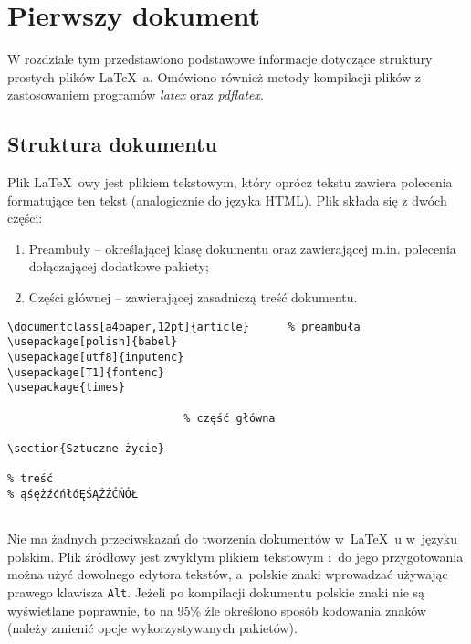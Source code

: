 \chapter{Pierwszy dokument}
\label{cha:pierwszyDokument}

W rozdziale tym przedstawiono podstawowe informacje dotyczące struktury prostych plików \LaTeX~a. Omówiono również metody kompilacji plików z zastosowaniem programów \emph{latex} oraz \emph{pdflatex}.


\section{Struktura dokumentu}
\label{sec:strukturaDokumentu}

Plik \LaTeX~owy jest plikiem tekstowym, który oprócz tekstu zawiera polecenia formatujące ten tekst (analogicznie do języka HTML). Plik składa się z dwóch części:
\begin{enumerate}%
      \item Preambuły -- określającej klasę dokumentu oraz zawierającej m.in. polecenia dołączającej dodatkowe pakiety;

      \item Części głównej -- zawierającej zasadniczą treść dokumentu.
\end{enumerate}

\begin{lstlisting}
\documentclass[a4paper,12pt]{article}      % preambuła
\usepackage[polish]{babel}
\usepackage[utf8]{inputenc}
\usepackage[T1]{fontenc}
\usepackage{times}

                           % część główna

\section{Sztuczne życie}

% treść
% ąśężźćńłóĘŚĄŻŹĆŃÓŁ


\end{lstlisting}

Nie ma żadnych przeciwskazań do tworzenia dokumentów w~\LaTeX~u w~języku polskim. Plik źródłowy jest zwykłym plikiem tekstowym i~do jego przygotowania można użyć dowolnego edytora tekstów, a~polskie znaki wprowadzać używając prawego klawisza \texttt{Alt}. Jeżeli po kompilacji dokumentu polskie znaki nie są wyświetlane poprawnie, to na 95\% źle określono sposób kodowania znaków (należy zmienić opcje wykorzystywanych pakietów).


